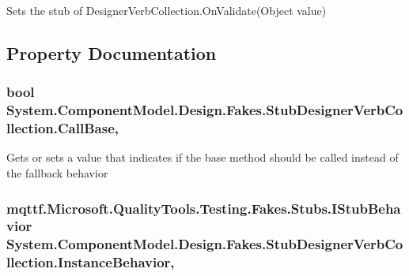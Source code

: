 Sets the stub of Designer\-Verb\-Collection.\-On\-Validate(\-Object value)



\subsection{Property Documentation}
\hypertarget{class_system_1_1_component_model_1_1_design_1_1_fakes_1_1_stub_designer_verb_collection_a9b761a995f4f3d0c8187b7da4b033518}{
\subsubsection[{Call\-Base}]{\setlength{\rightskip}{0pt plus 5cm}bool System.\-Component\-Model.\-Design.\-Fakes.\-Stub\-Designer\-Verb\-Collection.\-Call\-Base\hspace{0.3cm}{\ttfamily [get]}, {\ttfamily [set]}}}\label{class_system_1_1_component_model_1_1_design_1_1_fakes_1_1_stub_designer_verb_collection_a9b761a995f4f3d0c8187b7da4b033518}


Gets or sets a value that indicates if the base method should be called instead of the fallback behavior

\hypertarget{class_system_1_1_component_model_1_1_design_1_1_fakes_1_1_stub_designer_verb_collection_aa108f04bf4c7098f0c67b674cc6da659}{
\subsubsection[{Instance\-Behavior}]{\setlength{\rightskip}{0pt plus 5cm}mqttf.\-Microsoft.\-Quality\-Tools.\-Testing.\-Fakes.\-Stubs.\-I\-Stub\-Behavior System.\-Component\-Model.\-Design.\-Fakes.\-Stub\-Designer\-Verb\-Collection.\-Instance\-Behavior\hspace{0.3cm}{\ttfamily [get]}, {\ttfamily [set]}}}\label{class_system_1_1_component_model_1_1_design_1_1_fakes_1_1_stub_designer_verb_collection_aa108f04bf4c7098f0c67b674cc6da659}


